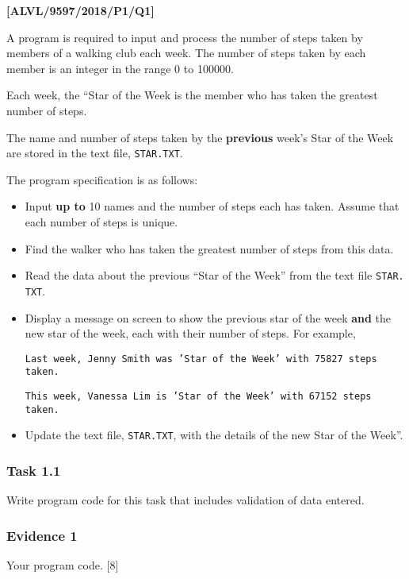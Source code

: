 \item \textbf{{[}ALVL/9597/2018/P1/Q1{]} }

A program is required to input and process the number of steps taken
by members of a walking club each week. The number of steps taken
by each member is an integer in the range 0 to 100000. 

Each week, the \textquotedblleft Star of the Week\textquotedbl{} is
the member who has taken the greatest number of steps. 

The name and number of steps taken by the \textbf{previous} week's
\textquotedbl Star of the Week\textquotedbl{} are stored in the text
file, \texttt{STAR.TXT}. 

The program specification is as follows: 
\begin{itemize}
\item Input \textbf{up to} 10 names and the number of steps each has taken.
Assume that each number of steps is unique. 
\item Find the walker who has taken the greatest number of steps from this
data. 
\item Read the data about the previous \textquotedblleft Star of the Week\textquotedblright{}
from the text file \texttt{STAR. TXT}. 
\item Display a message on screen to show the previous star of the week
\textbf{and} the new star of the week, each with their number of steps.
For example, 

\texttt{Last week, Jenny Smith was 'Star of the Week' with 75827 steps
taken. }

\texttt{This week, Vanessa Lim is 'Star of the Week' with 67152 steps
taken. }
\item Update the text file, \texttt{STAR.TXT}, with the details of the new
\textquotedbl Star of the Week\textquotedblright . 
\end{itemize}

\subsubsection*{Task 1.1}

Write program code for this task that includes validation of data
entered.

\subsubsection*{Evidence 1}

Your program code. \hfill{}{[}8{]}

